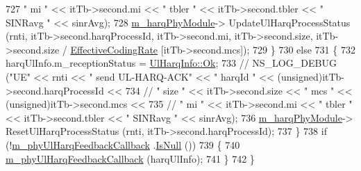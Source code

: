 \begin{DoxyCode}
727                                                                                                                 \textcolor{stringliteral}{
      " mi "} << itTb->second.mi << \textcolor{stringliteral}{" tbler "} << itTb->second.tbler << \textcolor{stringliteral}{" SINRavg "} << sinrAvg);
728                                                         \hyperlink{classns3_1_1MmWaveSpectrumPhy_a88d377424f8b4ca9745807ef3281e010}{m\_harqPhyModule}->
      UpdateUlHarqProcessStatus (rnti, itTb->second.harqProcessId, itTb->second.mi, itTb->second.size, itTb->second.size / 
      \hyperlink{namespacens3_af70af4887722b3badf3d57ca573d9502}{EffectiveCodingRate} [itTb->second.mcs]);
729                                                 \}
730                                                 \textcolor{keywordflow}{else}
731                                                 \{
732                                                         harqUlInfo.m\_receptionStatus = 
      \hyperlink{structns3_1_1UlHarqInfo_af1ea9a1ce02c9b4a551ac978484a4336ad61a738c75abe251c05daa2461ecf308}{UlHarqInfo::Ok};
733 \textcolor{comment}{//                                                      NS\_LOG\_DEBUG ("UE" << rnti << " send UL-HARQ-ACK"
       << " harqId " << (unsigned)itTb->second.harqProcessId <<}
734 \textcolor{comment}{//                                                                                                              
      " size " << itTb->second.size << " mcs " << (unsigned)itTb->second.mcs <<}
735 \textcolor{comment}{//                                                                                                              
      " mi " << itTb->second.mi << " tbler " << itTb->second.tbler << " SINRavg " << sinrAvg);}
736                                                         \hyperlink{classns3_1_1MmWaveSpectrumPhy_a88d377424f8b4ca9745807ef3281e010}{m\_harqPhyModule}->
      ResetUlHarqProcessStatus (rnti, itTb->second.harqProcessId);
737                                                 \}
738                                                 \textcolor{keywordflow}{if} (!\hyperlink{classns3_1_1MmWaveSpectrumPhy_a140e487a0f22edbd982eda38a76ac652}{m\_phyUlHarqFeedbackCallback}
      .\hyperlink{classns3_1_1Callback_aa8e27826badbf37f84763f36f70d9b54}{IsNull} ())
739                                                 \{
740                                                         
      \hyperlink{classns3_1_1MmWaveSpectrumPhy_a140e487a0f22edbd982eda38a76ac652}{m\_phyUlHarqFeedbackCallback} (harqUlInfo);
741                                                 \}
742                                         \}

\end{DoxyCode}
